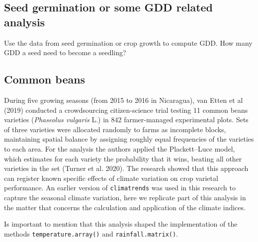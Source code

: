 \documentclass[
]{article}
\begin{document}
\hypertarget{seed-germination-or-some-gdd-related-analysis}{%
\subsection{Seed germination or some GDD related
analysis}\label{seed-germination-or-some-gdd-related-analysis}}

Use the data from seed germination or crop growth to compute GDD. How
many GDD a seed need to become a seedling?

\hypertarget{common-beans}{%
\subsection{Common beans}\label{common-beans}}

During five growing seasons (from 2015 to 2016 in Nicaragua), van Etten
et al (2019) conducted a crowdsourcing citizen-science trial testing 11
common beans varieties (\emph{Phaseolus vulgaris} L.) in 842
farmer-managed experimental plots. Sets of three varieties were
allocated randomly to farms as incomplete blocks, maintaining spatial
balance by assigning roughly equal frequencies of the varieties to each
area. For the analysis the authors applied the Plackett--Luce model,
which estimates for each variety the probability that it wins, beating
all other varieties in the set (Turner et al. 2020). The research showed
that this approach can register known specific effects of climate
variation on crop varietal performance. An earlier version of
\texttt{climatrends} was used in this research to capture the seasonal
climate variation, here we replicate part of this analysis in the matter
that concerns the calculation and application of the climate indices.

Is important to mention that this analysis shaped the implementation of
the methods \texttt{temperature.array()} and \texttt{rainfall.matrix()}.
\end{document}
